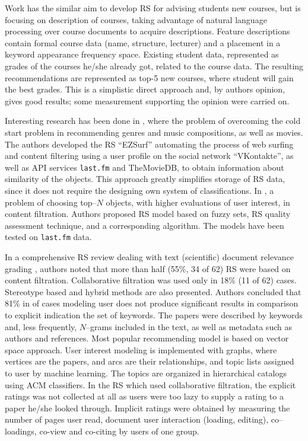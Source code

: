 \documentclass[conference,a4]{IEEEtran}
\begin{document}
Work \cite{naren} has the similar aim to develop RS for advising students new courses, but is focusing on description of courses, taking advantage of natural language processing over course documents to acquire descriptions.  Feature descriptions contain formal course data (name, structure, lecturer) and a placement in a keyword appearance frequency space.  Existing student data, represented as grades of the courses he/she already got, related to the course data.  The resulting recommendations are represented as top-5 new courses, where student will gain the best grades.  This is a simplistic direct approach and, by authors opinion, gives good results; some measurement supporting the opinion were carried on.



Interesting research has been done in \cite{br10}, where the problem of overcoming the cold start problem in recommending genres and music compositions, as well as movies.  The authors developed the RS ``EZSurf'' automating the process of web surfing and content filtering using a user profile on the social network ``VKontakte'', as well as API services \texttt{last.fm} and TheMovieDB, to obtain information about similarity of the objects.  This approach greatly simplifies storage of RS data, since it does not require the designing own system of classifications.  In \cite{br14}, a problem of choosing top--$N$ objects, with higher evaluations of user interest, in content filtration.  Authors proposed RS model based on fuzzy sets, RS quality assessment technique, and a corresponding algorithm.  The models have been tested on \texttt{last.fm} data.

In a comprehensive RS review dealing with text (scientific) document relevance grading \cite{br13}, authors noted that more than half (55\%, 34 of 62) RS were based on content filtration.  Collaborative filtration was used only in 18\% (11 of 62) cases.  Stereotype based and hybrid methods are also presented.  Authors concluded that 81\% in of cases modeling user does not produce significant results in comparison to explicit indication the set of keywords.  The papers were described by keywords and, less frequently, $N$--grams included in the text, as well as metadata such as authors and references.  Most popular recommending model is based on vector space approach.  User interest modeling is implemented with graphs, where vertices are the papers, and arcs are their relationships, and topic lists assigned to user by machine learning.  The topics are organized in hierarchical catalogs using ACM classifiers.  In the RS which used collaborative filtration, the explicit ratings was not collected at all as users were too lazy to supply a rating to a paper he/she looked through.  Implicit ratings were obtained by measuring the number of pages user read, document user interaction (loading, editing), co--loadings, co-view and co-citing by users of one group.
\end{document}
